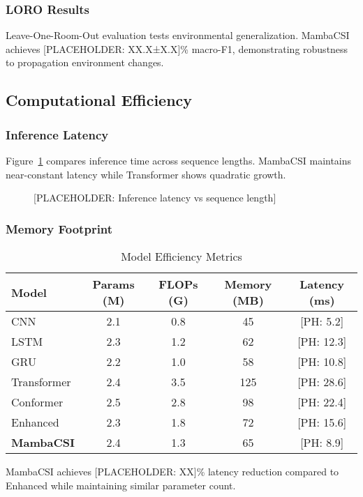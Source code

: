 \documentclass[journal]{IEEEtran}
\begin{document}
\subsubsection{LORO Results}
Leave-One-Room-Out evaluation tests environmental generalization. MambaCSI achieves [PLACEHOLDER: XX.X±X.X]\% macro-F1, demonstrating robustness to propagation environment changes.

\subsection{Computational Efficiency}

\subsubsection{Inference Latency}
Figure~\ref{fig:latency} compares inference time across sequence lengths. MambaCSI maintains near-constant latency while Transformer shows quadratic growth.

\begin{figure}[h]
\centering
\caption{[PLACEHOLDER: Inference latency vs sequence length]}
\label{fig:latency}
\end{figure}

\subsubsection{Memory Footprint}
\begin{table}[h]
\centering
\caption{Model Efficiency Metrics}
\label{tab:efficiency}
\begin{tabular}{lcccc}
\toprule
Model & Params (M) & FLOPs (G) & Memory (MB) & Latency (ms) \\
\midrule
CNN & 2.1 & 0.8 & 45 & [PH: 5.2] \\
LSTM & 2.3 & 1.2 & 62 & [PH: 12.3] \\
GRU & 2.2 & 1.0 & 58 & [PH: 10.8] \\
Transformer & 2.4 & 3.5 & 125 & [PH: 28.6] \\
Conformer & 2.5 & 2.8 & 98 & [PH: 22.4] \\
Enhanced & 2.3 & 1.8 & 72 & [PH: 15.6] \\
\textbf{MambaCSI} & 2.4 & 1.3 & 65 & [PH: 8.9] \\
\bottomrule
\end{tabular}
\end{table}

MambaCSI achieves [PLACEHOLDER: XX]\% latency reduction compared to Enhanced while maintaining similar parameter count.
\end{document}
